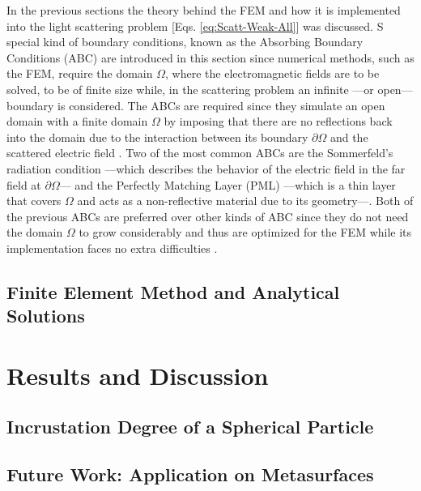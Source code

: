 \documentclass[11pt]{Latex/Classes/PhDthesisPSnPDF}
\begin{document}
        In the previous sections the theory behind the FEM and how it is  implemented into the light scattering problem [Eqs. \eqref{eq:Scatt-Weak-All}] was discussed.  S special kind of boundary conditions, known as the Absorbing Boundary Conditions (ABC) are introduced in this section since numerical methods, such as the FEM, require the domain $\Omega$, where the electromagnetic fields are to be solved, to be of finite size \cite{jin_theory_2010,bondeson_computational_2005} while, in the scattering problem an infinite ---or open--- boundary is considered. The  ABCs are required since they simulate an open domain with a finite domain $\Omega$ by imposing that there are no reflections back into the domain due to the interaction between its boundary $\partial\Omega$ and the scattered electric field \cite{bondeson_computational_2005,jin_theory_2010,chew_complex_1997}. Two of the most common ABCs are the Sommerfeld's radiation condition ---which describes the behavior of the electric field in the far field at $\partial\Omega$--- and the Perfectly Matching Layer (PML) ---which is a thin layer that covers $\Omega$ and acts as a non-reflective material due to its geometry---\cite{jin_theory_2010}.  Both of the previous ABCs are preferred over other kinds of ABC since they do not need the domain $\Omega$ to grow considerably and thus are optimized for the FEM while its implementation faces no extra difficulties \cite{jin_theory_2010}.

         

	\section{Finite Element Method and Analytical Solutions}
		\label{sec:FEM-Mie}
		

%

\chapter{Results and Discussion}
	
	\section{Incrustation Degree of a Spherical Particle}
%	
    \section{Future Work: Application on Metasurfaces}
\end{document}
